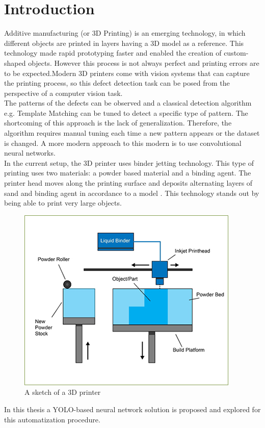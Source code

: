 \section{Introduction}

Additive manufacturing (or 3D Printing) is an emerging technology, in which different objects are printed in layers having a 3D model as a reference. This technology made rapid prototyping faster and enabled the creation of custom-shaped objects. However this process is not always perfect and printing errors are to be expected.Modern 3D printers come with vision systems that can capture the printing process, so this defect detection task can be posed from the perspective of a computer vision task. \\
The patterns of the defects can be observed and a classical detection algorithm e.g. Template Matching can be tuned to detect a specific type of pattern. The shortcoming of this approach is the lack of generalization. Therefore, the algorithm requires manual tuning each time a new pattern appears or the dataset is changed. A more modern approach to this modern is to use convolutional neural networks. \\
In the current setup, the 3D printer uses binder jetting technology. This type of printing uses two materials: a powder based material and a binding agent. The printer head moves along the printing surface and deposits alternating layers of sand and binding agent in accordance to a model \cite{binder_jetting}. This technology stands out by being able to print very large objects. \\
\begin{figure}[!h]
  \centering
  \captionsetup{justification=centering,margin=2cm}
  \includegraphics[width=0.5\linewidth]{images/introduction/binderjetting}
  \caption{A sketch of a 3D printer}
  \label{TODO}
\end{figure}
In this thesis a YOLO-based neural network solution is proposed and explored for this automatization procedure.  \\

